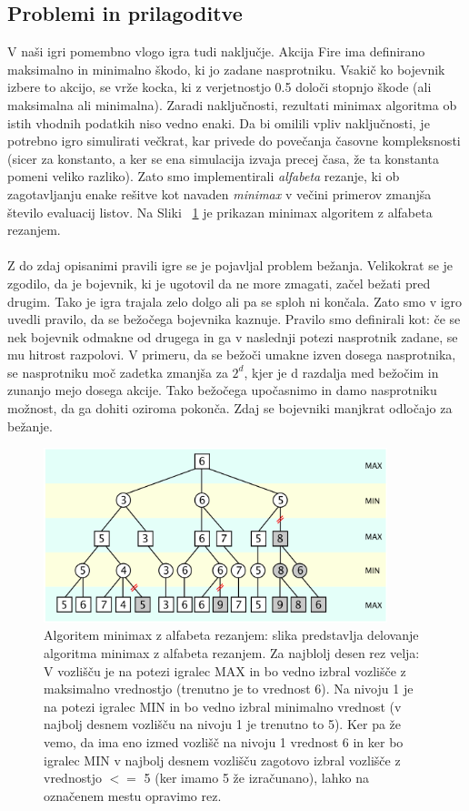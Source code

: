 \documentclass[12pt,a4paper,openany]{book}
\begin{document}
\subsection{Problemi in prilagoditve}
V naši igri pomembno vlogo igra tudi naključje. Akcija Fire ima definirano maksimalno in minimalno škodo, ki jo zadane nasprotniku. Vsakič ko bojevnik izbere to akcijo, se vrže kocka, ki z verjetnostjo 0.5 določi stopnjo škode (ali maksimalna ali minimalna). Zaradi naključnosti, rezultati minimax algoritma ob istih vhodnih podatkih niso vedno enaki. Da bi omilili vpliv naključnosti, je potrebno igro simulirati večkrat, kar privede do povečanja časovne kompleksnosti (sicer za konstanto, a ker se ena simulacija izvaja precej časa, že ta konstanta pomeni veliko razliko). Zato smo implementirali \textit{alfabeta} rezanje, ki ob zagotavljanju enake rešitve kot navaden \textit{minimax} v večini primerov zmanjša število evaluacij listov. Na Sliki ~\ref{fig:alfabeta} je prikazan minimax algoritem z alfabeta rezanjem.
\\
\\
Z do zdaj opisanimi pravili igre se je pojavljal problem bežanja. Velikokrat se je zgodilo, da je bojevnik, ki je ugotovil da ne more zmagati, začel bežati pred drugim. Tako je igra trajala zelo dolgo ali pa se sploh ni končala. Zato smo v igro uvedli pravilo, da se bežočega bojevnika kaznuje. Pravilo smo definirali kot: če se nek bojevnik odmakne od drugega in ga v naslednji potezi nasprotnik zadane, se mu hitrost razpolovi. V primeru, da se bežoči umakne izven dosega nasprotnika, se nasprotniku moč zadetka zmanjša za $2^d$, kjer je d razdalja med bežočim in zunanjo mejo dosega akcije. Tako bežočega upočasnimo in damo nasprotniku možnost, da ga dohiti oziroma pokonča. Zdaj se bojevniki manjkrat odločajo za bežanje.


\begin{figure}[ht]
 \centering
 \includegraphics[width=10cm]{alfabeta.png}
 \caption[Algoritem Minimax z alfabeta rezanjem.]{Algoritem minimax z alfabeta rezanjem: slika predstavlja delovanje algoritma minimax z alfabeta rezanjem. Za najblolj desen rez velja: V vozlišču je na potezi igralec MAX in bo vedno izbral vozlišče z maksimalno vrednostjo (trenutno je to vrednost 6). Na nivoju 1 je na potezi igralec MIN in bo vedno izbral minimalno vrednost (v najbolj desnem vozlišču na nivoju 1 je trenutno to 5). Ker pa že vemo, da ima eno izmed vozlišč na nivoju 1 vrednost 6 in ker bo igralec MIN v najbolj desnem vozlišču zagotovo izbral vozlišče z vrednostjo $<=$ 5 (ker imamo 5 že izračunano), lahko na označenem mestu opravimo rez.}
 \label{fig:alfabeta}
\end{figure}
\end{document}
